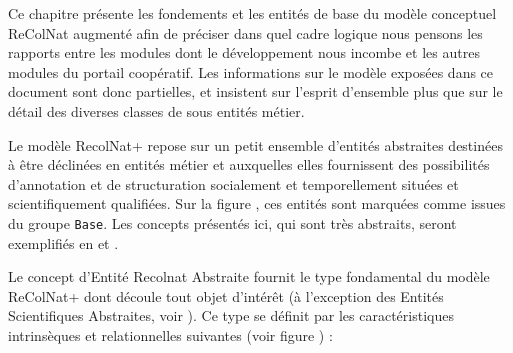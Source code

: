 \startchapter[title={Les entités de base du modèle RecolNat+},reference=model:base]

\startsection[title={Introduction}]

Ce chapitre présente les fondements et les entités de base du modèle conceptuel ReColNat augmenté afin de préciser dans quel cadre logique nous pensons les rapports entre les modules dont le développement nous incombe et les autres modules du portail coopératif.
Les informations sur le modèle exposées dans ce document sont donc partielles, et insistent sur l'esprit d'ensemble plus que sur le détail des diverses classes de sous entités métier.

Le modèle RecolNat+ repose sur un petit ensemble d'entités abstraites destinées à être déclinées en entités métier et auxquelles elles fournissent des possibilités d'annotation et de structuration socialement et temporellement situées et scientifiquement qualifiées.
Sur la figure , ces entités sont marquées comme issues du groupe {\tt Base}.
Les concepts présentés ici, qui sont très abstraits, seront exemplifiés en  et .


\stopsection
\startsection[title={Entité Recolnat Abstraite (ERA)}]

Le concept d'Entité Recolnat Abstraite fournit le type fondamental du modèle ReColNat+ dont découle tout objet d'intérêt (à l'exception des Entités Scientifiques Abstraites, voir ).
Ce type se définit par les caractéristiques intrinsèques et relationnelles suivantes (voir figure ) :

